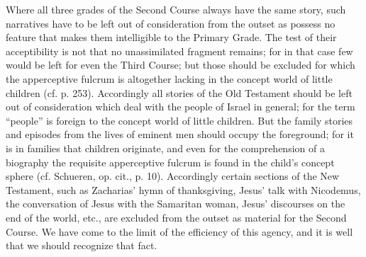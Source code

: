 Where all three grades of the Second Course always have the same story, such narratives have to be left out of consideration from the outset as possess no feature that makes them intelligible to the Primary Grade. The test of their acceptibility is not that no unassimilated fragment remains; for in that case few would be left for even the Third Course; but those should be excluded for which the apperceptive fulcrum is altogether lacking in the concept world of little children (cf. p. 253). Accordingly all stories of the Old Testament should be left out of consideration which deal with the people of Israel in general; for the term “people” is foreign to the concept world of little children. But the family stories and episodes from the lives of eminent men should occupy the foreground; for it is in families that children originate, and even for the comprehension of a biography the requisite apperceptive fulcrum is found in the child’s concept sphere (cf. Schueren, op. cit., p. 10). Accordingly certain sections of the New Testament, such as Zacharias’ hymn of thanksgiving, Jesus’ talk with Nicodemus, the conversation of Jesus with the Samaritan woman, Jesus’ discourses on the end of the world, etc., are excluded from the outset as material for the Second Course. We have come to the limit of the efficiency of this agency, and it is well that we should recognize that fact.

